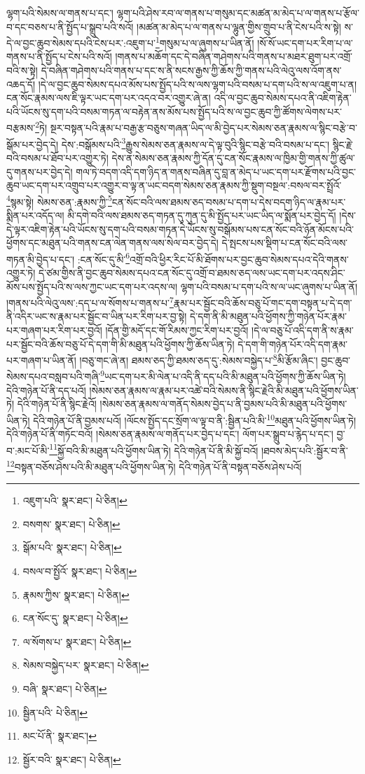 ལྷག་པའི་སེམས་ལ་གནས་པ་དང་། ལྷག་པའི་ཤེས་རབ་ལ་གནས་པ་གསུམ་དང་མཚན་མ་མེད་པ་ལ་གནས་པ་རྩོལ་བ་དང་བཅས་པ་ནི་སྤྱོད་པ་སྒྲུབ་པའི་སའོ། །མཚན་མ་མེད་པ་ལ་གནས་པ་ལྷུན་གྱིས་གྲུབ་པ་ནི་ངེས་པའི་ས་སྟེ། ས་དེ་ལ་བྱང་ཆུབ་སེམས་དཔའི་ངེས་པར་:འཇུག་པ་\footnote{འཇུག་པའི་  སྣར་ཐང་།  པེ་ཅིན། }གསུམ་པ་ལ་ཞུགས་པ་ཡིན་ནོ། །སོ་སོ་ཡང་དག་པར་རིག་པ་ལ་གནས་པ་ནི་སྤྱོད་པ་ངེས་པའི་སའོ། །གནས་པ་མཆོག་དང་དེ་བཞིན་གཤེགས་པའི་གནས་པ་མཐར་ཐུག་པར་འགྲོ་བའི་ས་སྟེ། དེ་བཞིན་གཤེགས་པའི་གནས་པ་དང་ས་ནི་སངས་རྒྱས་ཀྱི་ཆོས་ཀྱི་གནས་པའི་ལེའུ་ལས་འོག་ནས་འཆད་དོ། །དེ་ལ་བྱང་ཆུབ་སེམས་དཔའ་མོས་པས་སྤྱོད་པའི་ས་ལས་ལྷག་པའི་བསམ་པ་དག་པའི་ས་ལ་འཇུག་པ་ན། ངན་སོང་རྣམས་ལས་ཇི་ལྟར་ཡང་དག་པར་འདའ་བར་འགྱུར་ཞེ་ན། འདི་ལ་བྱང་ཆུབ་སེམས་དཔའ་ནི་འཇིག་རྟེན་པའི་ཡོངས་སུ་དག་པའི་བསམ་གཏན་ལ་བརྟེན་ནས་མོས་པས་སྤྱོད་པའི་ས་ལ་བྱང་ཆུབ་ཀྱི་ཚོགས་ལེགས་པར་བརྩམས་\footnote{བསགས་  སྣར་ཐང་།  པེ་ཅིན། }ཏེ། སྔར་བསྟན་པའི་རྣམ་པ་བརྒྱ་རྩ་བཅུས་གཞན་ཡིད་ལ་མི་བྱེད་པར་སེམས་ཅན་རྣམས་ལ་སྙིང་བརྩེ་བ་སྒོམ་པར་བྱེད་དེ། དེས་:བསྒོམས་པའི་\footnote{སྒོམ་པའི་  སྣར་ཐང་།  པེ་ཅིན། }རྒྱུས་སེམས་ཅན་རྣམས་ལ་དེ་ལྟ་བུའི་སྙིང་བརྩེ་བའི་བསམ་པ་དང་། སྙིང་རྗེ་བའི་བསམ་པ་ཐོབ་པར་འགྱུར་ཏེ། དེས་ན་སེམས་ཅན་རྣམས་ཀྱི་དོན་དུ་ངན་སོང་རྣམས་ལ་ཁྱིམ་གྱི་གནས་ཀྱི་ཚུལ་དུ་གནས་པར་བྱེད་དེ། གལ་ཏེ་བདག་འདི་དག་ཉིད་ན་གནས་བཞིན་དུ་བླ་ན་མེད་པ་ཡང་དག་པར་རྫོགས་པའི་བྱང་ཆུབ་ཡང་དག་པར་འགྲུབ་པར་འགྱུར་བ་ལྟ་ན་ཡང་བདག་སེམས་ཅན་རྣམས་ཀྱི་སྡུག་བསྔལ་:བསལ་བར་སྤྲོའོ་\footnote{བསལ་བ་སྤྱོའོ་  སྣར་ཐང་།  པེ་ཅིན། }སྙམ་སྟེ། སེམས་ཅན་:རྣམས་ཀྱི་\footnote{རྣམས་ཀྱིས་  སྣར་ཐང་།  པེ་ཅིན། }ངན་སོང་བའི་ལས་ཐམས་ཅད་བསམ་པ་དག་པ་དེས་བདག་ཉིད་ལ་རྣམ་པར་སྨིན་པར་འདོད་ལ། མི་དགེ་བའི་ལས་ཐམས་ཅད་གཏན་དུ་ཀུན་དུ་མི་སྤྱོད་པར་ཡང་ཡིད་ལ་སྨོན་པར་བྱེད་དོ། །དེས་དེ་ལྟར་འཇིག་རྟེན་པའི་ཡོངས་སུ་དག་པའི་བསམ་གཏན་དེ་ཡོངས་སུ་བསྒོམས་པས་ངན་སོང་བའི་ཉོན་མོངས་པའི་ཕྱོགས་དང་མཐུན་པའི་གནས་ངན་ལེན་གནས་ལས་སེལ་བར་བྱེད་དེ། དེ་སྤངས་པས་སྡིག་པ་ངན་སོང་བའི་ལས་གཏན་མི་བྱེད་པ་དང་། :ངན་སོང་དུ་མི་\footnote{ངན་སོང་དུ་  སྣར་ཐང་།  པེ་ཅིན། }འགྲོ་བའི་ཕྱིར་རིང་པོ་མི་ཐོགས་པར་བྱང་ཆུབ་སེམས་དཔའ་དེའི་གནས་འགྱུར་ཏེ། དེ་ཙམ་གྱིས་ནི་བྱང་ཆུབ་སེམས་དཔའ་ངན་སོང་དུ་འགྲོ་བ་ཐམས་ཅད་ལས་ཡང་དག་པར་འདས་ཤིང་མོས་པས་སྤྱོད་པའི་ས་ལས་ཀྱང་ཡང་དག་པར་འདས་ལ། ལྷག་པའི་བསམ་པ་དག་པའི་ས་ལ་ཡང་ཞུགས་པ་ཡིན་ནོ། །གནས་པའི་ལེའུ་ལས་:དད་པ་ལ་སོགས་པ་གནས་པ་\footnote{ལ་སོགས་པ་  སྣར་ཐང་།  པེ་ཅིན། }རྣམ་པར་སྦྱོང་བའི་ཆོས་བཅུ་པོ་གང་དག་བསྟན་པ་དེ་དག་ནི་འདིར་ཡང་ས་རྣམ་པར་སྦྱོང་བ་ཡིན་པར་རིག་པར་བྱ་སྟེ། དེ་དག་ནི་མི་མཐུན་པའི་ཕྱོགས་ཀྱི་གཉེན་པོར་རྣམ་པར་གཞག་པར་རིག་པར་བྱའོ། །དོན་གྱི་མདོ་དང་གོ་རིམས་ཀྱང་རིག་པར་བྱའོ། །དེ་ལ་བཅུ་པོ་འདི་དག་ནི་ས་རྣམ་པར་སྦྱོང་བའི་ཆོས་བཅུ་པོ་དེ་དག་གི་མི་མཐུན་པའི་ཕྱོགས་ཀྱི་ཆོས་ཡིན་ཏེ། དེ་དག་གི་གཉེན་པོར་འདི་དག་རྣམ་པར་གཞག་པ་ཡིན་ནོ། །བཅུ་གང་ཞེ་ན། ཐམས་ཅད་ཀྱི་ཐམས་ཅད་དུ་:སེམས་བསྐྱེད་པ་\footnote{སེམས་བསྐྱེད་པར་  སྣར་ཐང་།  པེ་ཅིན། }མི་རྩོམ་ཞིང་། བྱང་ཆུབ་སེམས་དཔའ་བསླབ་པའི་གཞི་\footnote{བཞི་  སྣར་ཐང་།  པེ་ཅིན། }ཡང་དག་པར་མི་ལེན་པ་འདི་ནི་དད་པའི་མི་མཐུན་པའི་ཕྱོགས་ཀྱི་ཆོས་ཡིན་ཏེ། དེའི་གཉེན་པོ་ནི་དད་པའོ། །སེམས་ཅན་རྣམས་ལ་རྣམ་པར་འཚེ་བའི་སེམས་ནི་སྙིང་རྗེའི་མི་མཐུན་པའི་ཕྱོགས་ཡིན་ཏེ། དེའི་གཉེན་པོ་ནི་སྙིང་རྗེའོ། །སེམས་ཅན་རྣམས་ལ་གནོད་སེམས་བྱེད་པ་ནི་བྱམས་པའི་མི་མཐུན་པའི་ཕྱོགས་ཡིན་ཏེ། དེའི་གཉེན་པོ་ནི་བྱམས་པའོ། །ལོངས་སྤྱོད་དང་སྲོག་ལ་ལྟ་བ་ནི་:སྦྱིན་པའི་མི་\footnote{སྦྱིན་པའི་  པེ་ཅིན། }མཐུན་པའི་ཕྱོགས་ཡིན་ཏེ། དེའི་གཉེན་པོ་ནི་གཏོང་བའོ། །སེམས་ཅན་རྣམས་ལ་གནོད་པར་བྱེད་པ་དང་། ལོག་པར་སྒྲུབ་པ་རྙེད་པ་དང་། བྱ་བ་:མང་པོ་མི་\footnote{མང་པོ་ནི་  སྣར་ཐང་། }སྐྱོ་བའི་མི་མཐུན་པའི་ཕྱོགས་ཡིན་ཏེ། དེའི་གཉེན་པོ་ནི་མི་སྐྱོ་བའོ། །ཐབས་མེད་པའི་:སྦྱོར་བ་ནི་\footnote{སྦྱོར་བའི་  སྣར་ཐང་།  པེ་ཅིན། }བསྟན་བཅོས་ཤེས་པའི་མི་མཐུན་པའི་ཕྱོགས་ཡིན་ཏེ། དེའི་གཉེན་པོ་ནི་བསྟན་བཅོས་ཤེས་པའོ། 